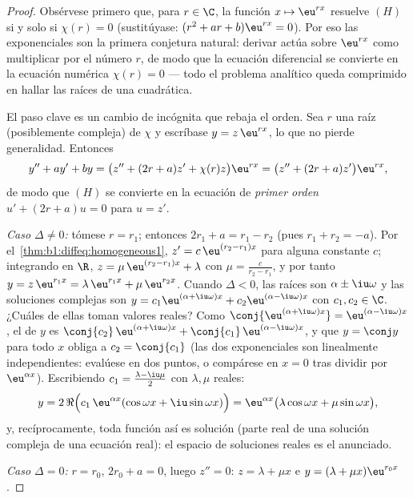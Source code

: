 \begin{proof}
Obsérvese primero que, para $r \in \C$, la función
$x \mapsto \eu^{rx}$ resuelve $(H)$ si y solo si $\chi(r) = 0$
(sustitúyase: $(r^2 + ar + b)\eu^{rx} = 0$). Por eso las exponenciales
son la primera conjetura natural: derivar actúa sobre $\eu^{rx}$ como
multiplicar por el número $r$, de modo que la ecuación diferencial se
convierte en la ecuación numérica $\chi(r) = 0$ --- todo el problema
analítico queda comprimido en hallar las raíces de una cuadrática.

El paso clave es un cambio de incógnita que rebaja el orden. Sea $r$
una raíz (posiblemente compleja) de $\chi$ y escríbase
$y = z\, \eu^{rx}$, lo que no pierde generalidad. Entonces
\[
y'' + ay' + by
= \bigl(z'' + (2r + a) z' + \chi(r) z\bigr)\eu^{rx}
= \bigl(z'' + (2r + a) z'\bigr)\eu^{rx},
\]
de modo que $(H)$ se convierte en la ecuación de \emph{primer orden}
$u' + (2r + a) u = 0$ para $u = z'$.

\emph{Caso $\Delta \neq 0$:} tómese $r = r_1$; entonces
$2r_1 + a = r_1 - r_2$ (pues $r_1 + r_2 = -a$). Por
el~\cref{thm:b1:diffeq:homogeneous1}, $z' = c\,\eu^{(r_2 - r_1)x}$ para
alguna constante $c$; integrando en $\R$,
$z = \mu\, \eu^{(r_2 - r_1)x} + \lambda$ con
$\mu = \frac{c}{r_2 - r_1}$, y por tanto
$y = z\,\eu^{r_1 x} = \lambda\,\eu^{r_1x} + \mu\,\eu^{r_2x}$.
Cuando $\Delta < 0$, las raíces son $\alpha \pm \iu\omega$ y las
soluciones complejas son $y = c_1\eu^{(\alpha+\iu\omega)x} +
c_2\eu^{(\alpha-\iu\omega)x}$ con $c_1, c_2 \in \C$. ¿Cuáles de ellas
toman valores reales? Como $\conj{\eu^{(\alpha+\iu\omega)x}} =
\eu^{(\alpha-\iu\omega)x}$, el  de $y$ es $\conj{c_2}\,
\eu^{(\alpha+\iu\omega)x} + \conj{c_1}\,\eu^{(\alpha-\iu\omega)x}$, y
que $y = \conj y$ para todo $x$ obliga a $c_2 = \conj{c_1}$ (las dos
exponenciales son linealmente independientes: evalúese en dos puntos, o
compárese en $x=0$ tras dividir por $\eu^{\alpha x}$). Escribiendo
$c_1 = \frac{\lambda - \iu\mu}2$ con $\lambda, \mu$ reales:
\[
y = 2\,\Re\Bigl(c_1\,\eu^{\alpha x}(\cos\omega x +
\iu\sin\omega x)\Bigr)
= \eu^{\alpha x}\bigl(\lambda\cos\omega x + \mu\sin\omega
x\bigr),
\]
y, recíprocamente, toda función así es solución (parte real de una
solución compleja de una ecuación real): el espacio de soluciones
reales es el anunciado.

\emph{Caso $\Delta = 0$:} $r = r_0$, $2r_0 + a = 0$, luego $z'' = 0$:
$z = \lambda + \mu x$ e $y = (\lambda + \mu x)\eu^{r_0 x}$.
\end{proof}

